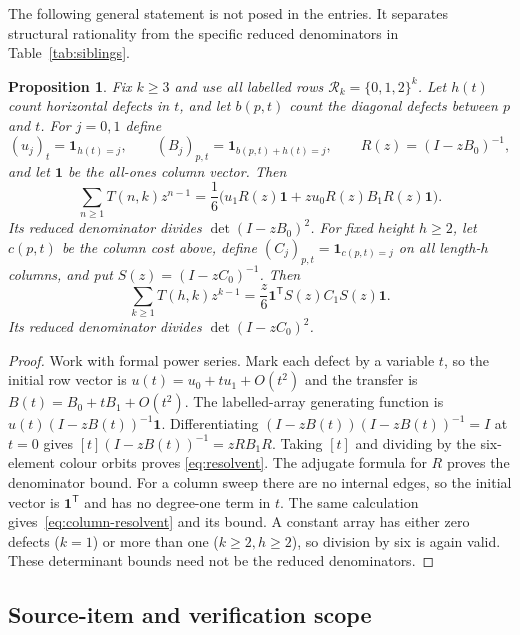 \documentclass[11pt,a4paper]{article}
\newtheorem{proposition}[theorem]{Proposition}
\newcommand{\ind}{\mathbf 1}
\begin{document}
The following general statement is not posed in the entries.
It separates structural rationality from the specific reduced
denominators in Table~\ref{tab:siblings}.
\begin{proposition}\label{prop:squares}
Fix $k\geq3$ and use all labelled rows $\mathcal R_k=\{0,1,2\}^k$.
Let $h(t)$ count horizontal defects in $t$, and let $b(p,t)$ count the
diagonal defects between $p$ and $t$. For $j=0,1$ define
\[
 (u_j)_t=\ind_{h(t)=j},\qquad
 (B_j)_{p,t}=\ind_{b(p,t)+h(t)=j},\qquad
 R(z)=(I-zB_0)^{-1},
\]
and let $\boldsymbol1$ be the all-ones column vector. Then
\begin{equation}\label{eq:resolvent}
 \sum_{n\geq1}T(n,k)z^{n-1}
  =\frac16\bigl(u_1R(z)\boldsymbol1
       +z u_0R(z)B_1R(z)\boldsymbol1\bigr).
\end{equation}
Its reduced denominator divides $\det(I-zB_0)^2$.
For fixed height $h\geq2$, let $c(p,t)$ be the column cost above, define
$(C_j)_{p,t}=\ind_{c(p,t)=j}$ on all length-$h$ columns, and
put $S(z)=(I-zC_0)^{-1}$. Then
\begin{equation}\label{eq:column-resolvent}
 \sum_{k\geq1}T(h,k)z^{k-1}
  =\frac z6\boldsymbol1^{\mathsf T}S(z)C_1S(z)\boldsymbol1.
\end{equation}
Its reduced denominator divides $\det(I-zC_0)^2$.
\end{proposition}
\begin{proof}
Work with formal power series. Mark each defect by a variable $t$,
so the initial row vector is $u(t)=u_0+t u_1+O(t^2)$
and the transfer is $B(t)=B_0+tB_1+O(t^2)$.
The labelled-array generating function is
$u(t)(I-zB(t))^{-1}\boldsymbol1$.
Differentiating $(I-zB(t))(I-zB(t))^{-1}=I$ at $t=0$ gives
$[t](I-zB(t))^{-1}=zR B_1R$.
Taking $[t]$ and dividing by the six-element colour orbits proves
\eqref{eq:resolvent}. The adjugate formula for $R$ proves the denominator
bound. For a column sweep there are no internal edges, so the initial
vector is $\boldsymbol1^{\mathsf T}$ and has no degree-one term in $t$.
The same calculation gives~\eqref{eq:column-resolvent} and its bound.
A constant array has either zero defects ($k=1$) or more than one
($k\geq2,h\geq2$), so division by six is again valid.
These determinant bounds need not be the reduced denominators.
\end{proof}

\subsection{Source-item and verification scope}
\end{document}
